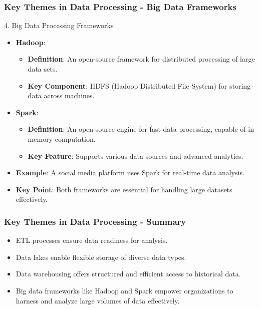 \documentclass[aspectratio=169]{beamer}
\begin{document}
\begin{frame}[fragile]
    \frametitle{Key Themes in Data Processing - Big Data Frameworks}
    \begin{block}{4. Big Data Processing Frameworks}
        \begin{itemize}
            \item \textbf{Hadoop}:
            \begin{itemize}
                \item \textbf{Definition}: An open-source framework for distributed processing of large data sets.
                \item \textbf{Key Component}: HDFS (Hadoop Distributed File System) for storing data across machines.
            \end{itemize}
            \item \textbf{Spark}:
            \begin{itemize}
                \item \textbf{Definition}: An open-source engine for fast data processing, capable of in-memory computation.
                \item \textbf{Key Feature}: Supports various data sources and advanced analytics.
            \end{itemize}
            \item \textbf{Example}: A social media platform uses Spark for real-time data analysis.
            \item \textbf{Key Point}: Both frameworks are essential for handling large datasets effectively.
        \end{itemize}
    \end{block}
\end{frame}

\begin{frame}[fragile]
    \frametitle{Key Themes in Data Processing - Summary}
    \begin{itemize}
        \item ETL processes ensure data readiness for analysis.
        \item Data lakes enable flexible storage of diverse data types.
        \item Data warehousing offers structured and efficient access to historical data.
        \item Big data frameworks like Hadoop and Spark empower organizations to harness and analyze large volumes of data effectively.
    \end{itemize}
\end{frame}
\end{document}
